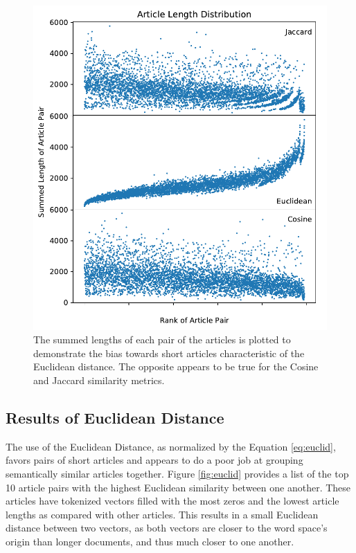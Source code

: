 \documentclass[11pt]{article}
\begin{document}
\begin{figure}[h] \label{fig:articlelengths}
  \centering
  \includegraphics[width=\textwidth]{figures/article_length_dist}
  \caption{The summed lengths of each pair of the articles is plotted to demonstrate the bias towards short articles characteristic of the Euclidean distance. The opposite appears to be true for the Cosine and Jaccard similarity metrics.}
\end{figure}

\subsection{Results of Euclidean Distance}

The use of the Euclidean Distance, as normalized by the Equation \ref{eq:euclid}, favors pairs of short articles and appears to do a poor job at grouping semantically similar articles together.
Figure \ref{fig:euclid} provides a list of the top 10 article pairs with the highest Euclidean similarity between one another.
These articles have tokenized vectors filled with the most zeros and the lowest article lengths as compared with other articles.
This results in a small Euclidean distance between two vectors, as both vectors are closer to the word space's origin than longer documents, and thus much closer to one another.
\end{document}
